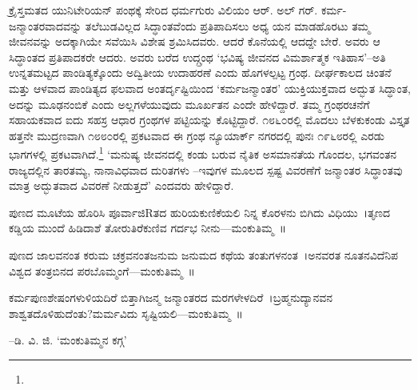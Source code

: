 
ಕ್ರೈಸ್ತಮತದ ಯುನಿಟೇರಿಯನ್ ಪಂಥಕ್ಕೆ ಸೇರಿದ ಧರ್ಮಗುರು ವಿಲಿಯಂ ಆರ್. ಅಲ್ ಗರ್. ಕರ್ಮ-ಜನ್ಮಾಂತರವಾದವನ್ನು ತಲೆಬುಡವಿಲ್ಲದ ಸಿದ್ಧಾಂತವೆಂದು ಪ್ರತಿಪಾದಿಸಲು ಅಧ್ಯ ಯನ ಮಾಡಹೊರಟು ತಮ್ಮ ಜೀವನವನ್ನು ಅದಕ್ಕಾಗಿಯೇ ಸವೆಯಿಸಿ ವಿಶೇಷ ಶ್ರಮಿಸಿದವರು. ಆದರೆ ಕೊನೆಯಲ್ಲಿ ಆದದ್ದೇ ಬೇರೆ. ಅವರು ಆ ಸಿದ್ಧಾಂತದ ಪ್ರತಿಪಾದಕರೇ ಆದರು. ಅವರು ಬರೆದ ಉದ್ಗ್ರಂಥ ‘ಭವಿಷ್ಯ ಜೀವನದ ವಿಮರ್ಶಾತ್ಮಕ ಇತಿಹಾಸ’–ಅತಿ ಉನ್ನತಮಟ್ಟದ ಪಾಂಡಿತ್ಯಕ್ಕೊಂದು ಅದ್ವಿತೀಯ ಉದಾಹರಣೆ ಎಂದು ಹೊಗಳಲ್ಪಟ್ಟ ಗ್ರಂಥ. ದೀರ್ಘಕಾಲದ ಚಿಂತನೆ ಮತ್ತು ಆಳವಾದ ಪಾಂಡಿತ್ಯದ ಫಲವಾದ ಅಂತರ್ದೃಷ್ಟಿಯಿಂದ ‘ಕರ್ಮಜನ್ಮಾಂತರ’ ಯುಕ್ತಿಯುಕ್ತವಾದ ಅದ್ಭುತ ಸಿದ್ಧಾಂತ, ಅದನ್ನು ಮೂಢನಂಬಿಕೆ ಎಂದು ಅಲ್ಲಗಳೆಯುವುದು ಮೂರ್ಖತನ ಎಂದೇ ಹೇಳಿದ್ದಾರೆ. ತಮ್ಮ ಗ್ರಂಥರಚನೆಗೆ ಸಹಾಯಕವಾದ ಐದು ಸಹಸ್ರ ಆಧಾರ ಗ್ರಂಥಗಳ ಪಟ್ಟಿಯನ್ನು ಕೊಟ್ಟಿದ್ದಾರೆ. ೧೮೬೦ರಲ್ಲಿ ಮೊದಲು ಬೆಳಕುಕಂಡು ವಿಸ್ತೃತ ಹತ್ತನೇ ಮುದ್ರಣವಾಗಿ ೧೮೮೦ರಲ್ಲಿ ಪ್ರಕಟವಾದ ಈ ಗ್ರಂಥ ನ್ಯೂಯಾರ್ಕ್ ನಗರದಲ್ಲಿ ಪುನಃ ೧೯೬೮ರಲ್ಲಿ ಎರಡು ಭಾಗಗಳಲ್ಲಿ ಪ್ರಕಟವಾಗಿದೆ.\footnote{} ‘ಮನುಷ್ಯ ಜೀವನದಲ್ಲಿ ಕಂಡು ಬರುವ ನೈತಿಕ ಅಸಮಾನತೆಯ ಗೊಂದಲ, ಭಗವಂತನ ರಾಜ್ಯದಲ್ಲಿನ ತಾರತಮ್ಯ, ನಾನಾವಿಧವಾದ ದುರಿತಗಳು –ಇವುಗಳ ಮೂಲದ ಸ್ಪಷ್ಟ ವಿವರಣೆಗೆ ಜನ್ಮಾಂತರ ಸಿದ್ಧಾಂತವು ಮಾತ್ರ ಅದ್ಭುತವಾದ ವಿವರಣೆ ನೀಡುತ್ತದೆ’ ಎಂದವರು ಹೇಳಿದ್ದಾರೆ.

ಪುಣದ ಮೂಟೆಯ ಹೊರಿಸಿ ಪೂರ್ವಾಜಿRತದ ಹುರಿಯಕುಣಿಕೆಯಲಿ ನಿನ್ನ ಕೊರಳನು ಬಿಗಿದು ವಿಧಿಯು~।ತೃಣದ ಕಡ್ಡಿಯ ಮುಂದೆ ಹಿಡಿದಾಶೆ ತೋರುತಿರೆಕುಣಿವ ಗರ್ದಭ ನೀನು—ಮಂಕುತಿಮ್ಮ~॥

ಪುಣದ ಜಾಲವನಂತ ಕರುಮ ಚಕ್ರವನಂತಜನುಮ ಜನುಮದ ಕಥೆಯ ತಂತುಗಳನಂತ~।ಅನವರತ ನೂತನವಿದೆನಿಪ ವಿಶ್ವದ ತಂತ್ರಬಿನದ ಪರಬೊಮ್ಮಂಗೆ—ಮಂಕುತಿಮ್ಮ~॥

ಕರ್ಮಪುಣಶೇಷಂಗಳುಳಿಯದಿರೆ ಬಿತ್ತಾಗಿಜನ್ಮ ಜನ್ಮಾಂತರದ ಮರಗಳೇಳದಿರೆ~।ಬ್ರಹ್ಮನುದ್ಯಾನವನ ಶಾಶ್ವತದೊಳಿಹುದೆಂತು?ಮರ್ಮವಿದು ಸೃಷ್ಟಿಯಲಿ—ಮಂಕುತಿಮ್ಮ~॥

–ಡಿ. ವಿ. ಜಿ. ‘ಮಂಕುತಿಮ್ಮನ ಕಗ್ಗ’

